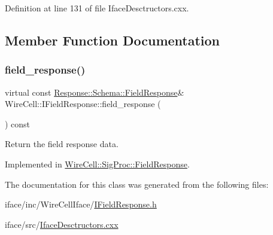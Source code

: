 Definition at line 131 of file Iface\+Desctructors.\+cxx.



\subsection{Member Function Documentation}
\mbox{\label{class_wire_cell_1_1_i_field_response_a367f57c6ea973d7aa51022f6e3640256}} 
\subsubsection{\texorpdfstring{field\+\_\+response()}{field\_response()}}
{\footnotesize\ttfamily virtual const \hyperlink{struct_wire_cell_1_1_response_1_1_schema_1_1_field_response}{Response\+::\+Schema\+::\+Field\+Response}\& Wire\+Cell\+::\+I\+Field\+Response\+::field\+\_\+response (\begin{DoxyParamCaption}{ }\end{DoxyParamCaption}) const\hspace{0.3cm}{\ttfamily [pure virtual]}}



Return the field response data. 



Implemented in \hyperlink{class_wire_cell_1_1_sig_proc_1_1_field_response_a417bd4fb3bbcae69c78ae5db0ae40f41}{Wire\+Cell\+::\+Sig\+Proc\+::\+Field\+Response}.



The documentation for this class was generated from the following files\+:\begin{DoxyCompactItemize}
\item 
iface/inc/\+Wire\+Cell\+Iface/\hyperlink{_i_field_response_8h}{I\+Field\+Response.\+h}\item 
iface/src/\hyperlink{_iface_desctructors_8cxx}{Iface\+Desctructors.\+cxx}\end{DoxyCompactItemize}

